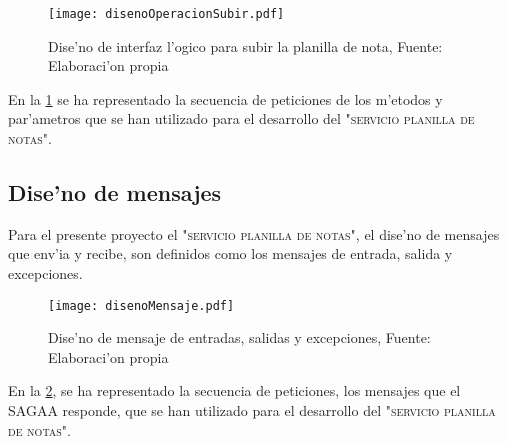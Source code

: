 \begin{figure}
\centering
\texttt{[image: disenoOperacionSubir.pdf]}
\captionsetup{justification=centering, margin=2cm}
\caption{Dise'no de interfaz l'ogico para subir la planilla de nota, Fuente: Elaboraci'on propia}
\label{fig:DisenoSubir}
\end{figure}
En la \ref{fig:DisenoSubir} se ha representado la secuencia de peticiones de los m'etodos y par'ametros que se han utilizado para el desarrollo del \textsc{"servicio planilla de notas"}.

\subsection{Dise'no de mensajes}
Para el presente proyecto el \textsc{"servicio planilla de notas"}, el  dise'no de mensajes que env'ia y recibe, son definidos como los mensajes de entrada, salida y excepciones.

\begin{figure}
\centering
\texttt{[image: disenoMensaje.pdf]}
\captionsetup{justification=centering, margin=2cm}
\caption{Dise'no de mensaje de entradas, salidas y excepciones, Fuente: Elaboraci'on propia}
\label{fig:DisenoMensaje}
\end{figure}
En la \ref{fig:DisenoMensaje}, se ha representado la secuencia de peticiones, los mensajes que el SAGAA responde, que se han utilizado para el desarrollo del \textsc{"servicio planilla de notas"}.





